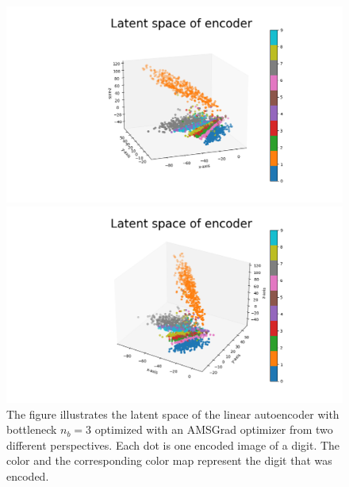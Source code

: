 \begin{figure}
\begin{center}
   \begin{minipage}[b]{0.49\linewidth}
      \includegraphics[width=\linewidth]{linear_AE_3d_amsgrad_latent_1}
	\end{minipage}
   \begin{minipage}[b]{0.49\linewidth}
      \includegraphics[width=\linewidth]{linear_AE_3d_amsgrad_latent_2}
	\end{minipage}
\end{center}
\caption{The figure illustrates the latent space of the linear autoencoder with bottleneck $n_b=3$ optimized with an AMSGrad optimizer from two different perspectives. Each dot is one encoded image of a digit. The color and the corresponding color map represent the digit that was encoded.}\label{fig:linear_AE_3d_amsgrad_latent}
\end{figure}



